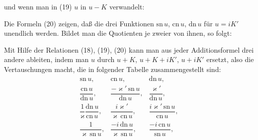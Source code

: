 und wenn man in (19) $u$ in $u - K$ verwandelt:

Die Formeln (20) zeigen, da\ss{} die drei Funktionen $\mathrm{sn}\,u$, $\mathrm{cn}\,u$, $\mathrm{dn}\,u$ f\"ur $u = iK'$ unendlich werden. Bildet man die Quotienten je zweier von ihnen, so folgt:

Mit Hilfe der Relationen (18), (19), (20) kann man aus jeder Additionsformel drei andere ableiten, indem man $u$ durch $u + K$, $u + K + iK'$, $u + iK'$ ersetzt, also die Vertauschungen macht, die in folgender Tabelle zusammengestellt sind:
\[
\begin{array}{ccc}
\mathrm{sn}\,u, & \mathrm{cn}\,u, & \mathrm{dn}\,u, \\ \hline
\dfrac{\mathrm{cn}\,u}{\mathrm{dn}\,u}, & \dfrac{-\varkappa'\,\mathrm{sn}\,u}{\mathrm{dn}\,u}, & \dfrac{\varkappa'}{\mathrm{dn}\,u}, \\[2ex]
\dfrac{1}{\varkappa}\dfrac{\mathrm{dn}\,u}{\mathrm{cn}\,u}, & \dfrac{i\varkappa'}{\varkappa\,\mathrm{cn}\,u}, & \dfrac{i\varkappa'\,\mathrm{sn}\,u}{\mathrm{cn}\,u}, \\[2ex]
\dfrac{1}{\varkappa\,\mathrm{sn}\,u}, & \dfrac{-i\,\mathrm{dn}\,u}{\varkappa\,\mathrm{sn}\,u}, & \dfrac{-i\,\mathrm{cn}\,u}{\mathrm{sn}\,u},
\end{array}
\]
